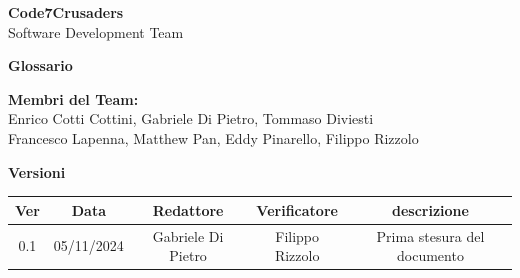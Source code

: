 \documentclass[italian,12pt]{article}
\begin{document}
\begin{titlepage}
    {\Huge \textbf{Code7Crusaders}}\\
    \vspace{0.5cm}
    {\Large Software Development Team}\\
    \vspace{2cm}
    
    \large \textbf{Glossario}
    \vspace{3.9cm}

    \textbf{Membri del Team:}\\
    Enrico Cotti Cottini, Gabriele Di Pietro, Tommaso Diviesti \\
    Francesco Lapenna, Matthew Pan, Eddy Pinarello, Filippo Rizzolo \\
    \vspace{0.5cm}
    
    \vspace{1cm}
\end{titlepage}

\newpage
\begin{center}
    \textbf{Versioni}
    \\
    \vspace{0.3cm}
    \begin{tabular}{|c|c|c|c|c|}
        \hline
        \textbf{Ver} & \textbf{Data} & \textbf{Redattore} & \textbf{Verificatore} & \textbf{descrizione}\\
        \hline
        0.1 & 05/11/2024 & Gabriele Di Pietro & Filippo Rizzolo & Prima stesura del documento \\
        \hline
    \end{tabular}
\end{center}
\newpage

\newpage

\printglossary[style=myaltlistgroup,title=]
\end{document}
